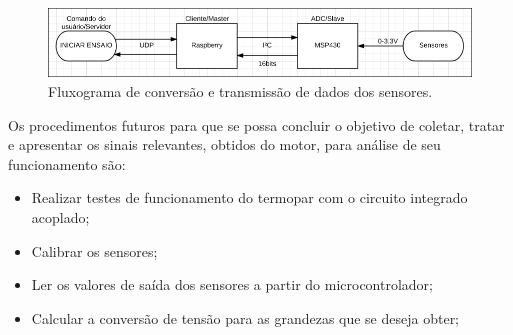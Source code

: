 \begin{figure}[h!]
	\centering
	\includegraphics[keepaspectratio=true,scale= 0.7]{figuras/diagrama_de_transmissao.PNG}
	\caption{ Fluxograma de conversão e transmissão de dados dos sensores.}
	\label{Fluxograma1}
\end{figure}
Os procedimentos futuros para que se possa concluir o objetivo de coletar, tratar e apresentar os sinais relevantes, obtidos do motor, para análise de seu funcionamento são:
\begin{itemize}
	\item Realizar testes de funcionamento do termopar com o circuito integrado acoplado;
	\item Calibrar os sensores;
	\item Ler os valores de saída dos sensores a partir do microcontrolador;
	\item Calcular a conversão de tensão para as grandezas que se deseja obter;	
\end{itemize}
